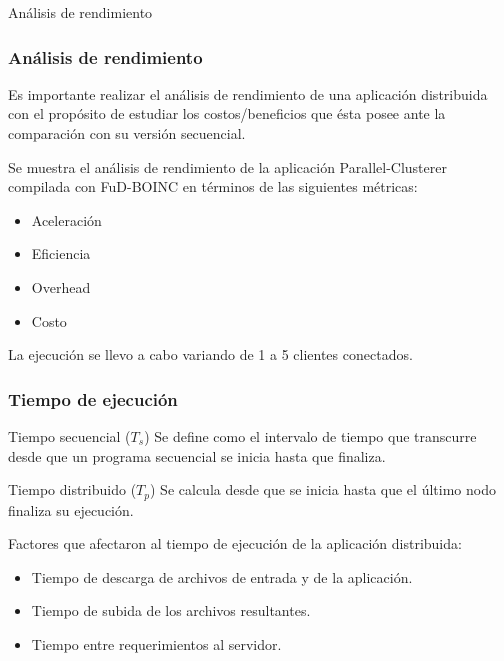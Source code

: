 \begin{subsection}{Análisis de rendimiento}
\begin{frame}\frametitle{Análisis de rendimiento}

\begin{block}{}
Es importante realizar el análisis de rendimiento de una aplicación distribuida con el propósito de estudiar los costos/beneficios que ésta posee ante la comparación con su versión secuencial.
\end{block}

\begin{block}{}
Se muestra el análisis de rendimiento de la aplicación Parallel-Clusterer compilada con FuD-BOINC en términos de las siguientes métricas:

\begin{itemize}
\item Aceleración
\item Eficiencia
\item Overhead
\item Costo
\end{itemize}

La ejecución se llevo a cabo variando de 1 a 5 clientes conectados.

\end{block}

\end{frame}

\begin{frame}\frametitle{Tiempo de ejecución}

\begin{block}{Tiempo secuencial (\textbf{$T_s$})}
Se define como el intervalo de tiempo que transcurre desde que un programa secuencial se inicia hasta que finaliza.
\end{block}

\pause
\begin{block}{Tiempo distribuido (\textbf{$T_p$})}
Se calcula desde que se inicia hasta que el último nodo finaliza su ejecución.
\end{block}

\pause
\begin{block}{}
Factores que afectaron al tiempo de ejecución de la aplicación distribuida:

\begin{itemize}
\item Tiempo de descarga de archivos de entrada y de la aplicación.
\item Tiempo de subida de los archivos resultantes.
\item Tiempo entre requerimientos al servidor.
\end{itemize}


\end{block}
\end{frame}
\end{subsection}
